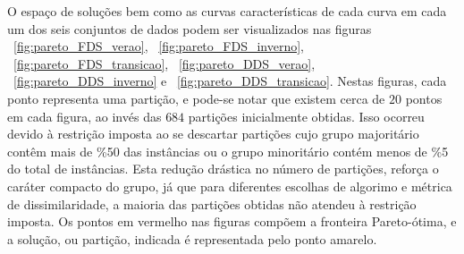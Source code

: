 O espaço de soluções bem como as curvas características de cada curva em cada um dos seis conjuntos de dados podem ser visualizados nas figuras ~\ref{fig:pareto_FDS_verao}, ~\ref{fig:pareto_FDS_inverno}, ~\ref{fig:pareto_FDS_transicao}, ~\ref{fig:pareto_DDS_verao}, ~\ref{fig:pareto_DDS_inverno} e ~\ref{fig:pareto_DDS_transicao}. Nestas figuras, cada ponto representa uma partição, e pode-se notar que existem cerca de $20$ pontos em cada figura, ao invés das $684$ partições inicialmente obtidas. Isso ocorreu devido à restrição imposta ao se descartar partições cujo grupo majoritário contêm mais de \%50 das instâncias ou o grupo minoritário contém menos de \%5 do total de instâncias. Esta redução drástica no número de partições, reforça o caráter compacto do grupo, já que para diferentes escolhas de algorimo e métrica de dissimilaridade, a maioria das partições obtidas não atendeu à restrição imposta. Os pontos em vermelho nas figuras compõem a fronteira Pareto-ótima, e a solução, ou partição, indicada é representada pelo ponto amarelo.


